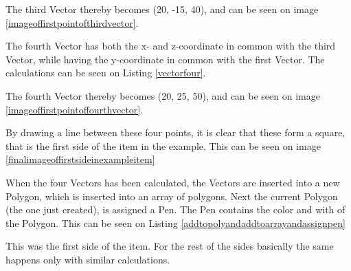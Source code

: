 
The third Vector thereby becomes (20, -15, 40), and can be seen on image \ref{imageoffirstpointofthirdvector}.


The fourth Vector has both the x- and z-coordinate in common with the third Vector, while having the y-coordinate in common with the first Vector. The calculations can be seen on Listing \ref{vectorfour}.


The fourth Vector thereby becomes (20, 25, 50), and can be seen on image \ref{imageoffirstpointoffourthvector}.


By drawing a line between these four points, it is clear that these form a square, that is the first side of the item in the example. This can be seen on image \ref{finalimageoffirstsideinexampleitem}

When the four Vectors has been calculated, the Vectors are inserted into a new Polygon, which is inserted into an array of polygons.  Next the current Polygon (the one just created), is assigned a Pen. The Pen contains the color and with of the Polygon. This can be seen on Listing \ref{addtopolyandaddtoarrayandassignpen}


This was the first side of the item. For the rest of the sides basically the same happens only with similar calculations. 